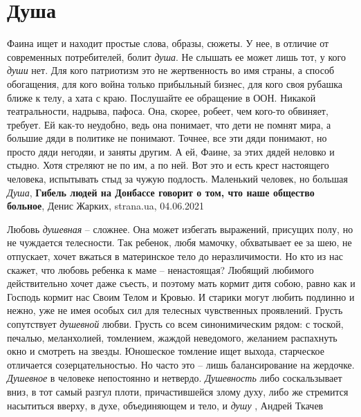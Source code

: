  
 
 
 
 
\chapter{Душа}
\label{sec:slova.dusha}

Фаина ищет и находит простые слова, образы, сюжеты. У нее, в отличие от
современных потребителей, болит \emph{душа}. Не слышать ее может лишь тот, у кого \emph{души}
нет. Для кого патриотизм это не жертвенность во имя страны, а способ
обогащения, для кого война только прибыльный бизнес, для кого своя рубашка
ближе к телу, а хата с краю.  Послушайте ее обращение в ООН. Никакой
театральности, надрыва, пафоса. Она, скорее, робеет, чем кого-то обвиняет,
требует. Ей как-то неудобно, ведь она понимает, что дети не помнят мира, а
большие дяди в политике не понимают. Точнее, все эти дяди понимают, но просто
дяди негодяи, и заняты другим. А ей, Фаине, за этих дядей неловко и стыдно.
Хотя стреляют не по им, а по ней. Вот это и есть крест настоящего человека,
испытывать стыд за чужую подлость. Маленький человек, но большая \emph{Душа},
\textbf{Гибель людей на Донбассе говорит о том, что наше общество больное},
Денис Жарких, strana.ua, 04.06.2021

Любовь \emph{душевная} – сложнее. Она может избегать выражений, присущих полу, но не
чуждается телесности. Так ребенок, любя мамочку, обхватывает ее за шею, не
отпускает, хочет вжаться в материнское тело до неразличимости. Но кто из нас
скажет, что любовь ребенка к маме – ненастоящая? Любящий любимого действительно
хочет даже съесть, и поэтому мать кормит дитя собою, равно как и Господь кормит
нас Своим Телом и Кровью. И старики могут любить подлинно и нежно, уже не имея
особых сил для телесных чувственных проявлений.  Грусть сопутствует \emph{душевной}
любви. Грусть со всем синонимическим рядом: с тоской, печалью, меланхолией,
томлением, жаждой неведомого, желанием распахнуть окно и смотреть на звезды.
Юношеское томление ищет выхода, старческое отличается созерцательностью. Но
часто это – лишь балансирование на жердочке. \emph{Душевное} в человеке непостоянно и
нетвердо. \emph{Душевность} либо соскальзывает вниз, в тот самый разгул плоти,
причастившейся злому духу, либо же стремится насытиться вверху, в духе,
объединяющем и тело, и \emph{душу}
, Андрей Ткачев
